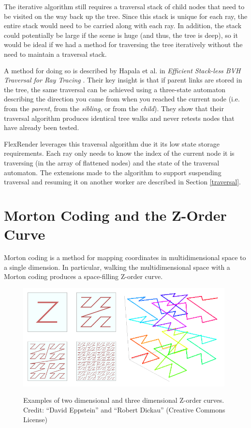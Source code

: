 \documentclass[12pt]{ucthesis}
\newcommand{\captionfonts}{\small\bf\ssp}
\begin{document}
The iterative algorithm still requires a traversal stack of child nodes that
need to be visited on the way back up the tree. Since this stack is unique for
each ray, the entire stack would need to be carried along with each ray. In
addition, the stack could potentially be large if the scene is huge (and thus,
the tree is deep), so it would be ideal if we had a method for traversing the
tree iteratively without the need to maintain a traversal stack.

A method for doing so is described by Hapala et al. in
\emph{Efficient Stack-less BVH Traversal for Ray Tracing} \cite{hapala:2011}.
Their key insight is that if parent links are stored in the tree, the same
traversal can be achieved using a three-state automaton describing the direction
you came from when you reached the current node (i.e. from the \emph{parent},
from the \emph{sibling}, or from the \emph{child}). They show that their
traversal algorithm produces identical tree walks and never retests nodes that
have already been tested.

FlexRender leverages this traversal algorithm due it its low state storage
requirements. Each ray only needs to know the index of the current node it is
traversing (in the array of flattened nodes) and the state of the traversal
automaton. The extensions made to the algorithm to support suspending traversal
and resuming it on another worker are described in Section \ref{traversal}.

\section{Morton Coding and the Z-Order Curve}
\label{morton}

Morton coding is a method for mapping coordinates in multidimensional space to
a single dimension. In particular, walking the multidimensional space with a
Morton coding produces a space-filling Z-order curve.

\begin{figure}[h!]
    \centering
    \includegraphics[width=110mm]{figures/zorder.png}
    \captionfonts
    \caption{Examples of two dimensional and three dimensional Z-order curves. Credit: ``David Eppstein'' and ``Robert Dickau'' (Creative Commons License)}
    \label{fig:zorder}
\end{figure}
\end{document}
